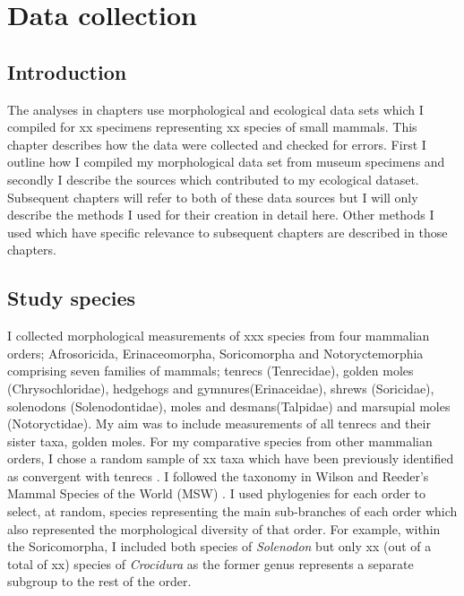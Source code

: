 \chapter{Data collection}
\label{chap:methods}

\section{Introduction}

The analyses in chapters %
use morphological and ecological data sets which I compiled for xx specimens representing xx species of small mammals. This chapter describes how the data were collected and checked for errors. First I outline how I compiled my morphological data set from museum specimens and secondly I describe the sources which contributed to my ecological dataset. Subsequent chapters will refer to both of these data sources but I will only describe the methods I used for their creation in detail here. Other methods I used which have specific relevance to subsequent chapters are described in those chapters.   

\section{Study species}
I collected morphological measurements of xxx species from  four mammalian orders; Afrosoricida, Erinaceomorpha, Soricomorpha and Notoryctemorphia comprising seven families of mammals; tenrecs (Tenrecidae), golden moles (Chrysochloridae), hedgehogs and gymnures(Erinaceidae), shrews (Soricidae), solenodons (Solenodontidae), moles and desmans(Talpidae) and marsupial moles (Notoryctidae).
My aim was to include measurements of all tenrecs and their sister taxa, golden moles.  For my  comparative species from other mammalian orders, I chose a random sample of xx taxa which have been previously identified as convergent with tenrecs \citep[e.g.][]{Gould1966, Symonds2005, Poux2008, Olson2013}. I followed the taxonomy in Wilson and Reeder's Mammal Species of the World (MSW) \citeyearpar{Wilson2005}. I used phylogenies for each order to select, at random, species representing the main sub-branches of each order which also represented the morphological diversity of that order. For example, within the Soricomorpha, I included both species of \textit{Solenodon} but only xx (out of a total of xx) species of \textit{Crocidura} as the former genus represents a separate subgroup to the rest of the order. 

